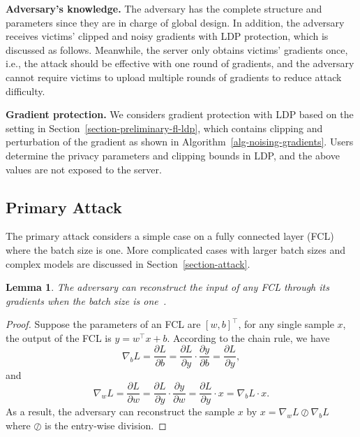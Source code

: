 \documentclass[lettersize,journal]{IEEEtran}
\newtheorem{lemma}{Lemma}
\begin{document}
\textbf{Adversary's knowledge.} 
The adversary has the complete structure and parameters since they are in charge of global design. In addition, the adversary receives victims' clipped and noisy gradients with LDP protection, which is discussed as follows. Meanwhile, the server only obtains victims' gradients once, i.e., the attack should be effective with one round of gradients, and the adversary cannot require victims to upload multiple rounds of gradients to reduce attack difficulty.

\textbf{Gradient protection.} We considers gradient protection with LDP based on the setting in Section~\ref{section-preliminary-fl-ldp}, which contains clipping and perturbation of the gradient as shown in Algorithm~\ref{alg-noising-gradients}. Users determine the privacy parameters and clipping bounds in LDP, and the above values are not exposed to the server.

\subsection{Primary Attack}
\label{section-primacy-attack}

The primary attack considers a simple case on a fully connected layer (FCL) where the batch size is one. More complicated cases with larger batch sizes and complex models are discussed in Section~\ref{section-attack}.

\begin{lemma}
The adversary can reconstruct the input of any FCL through its gradients when the batch size is one~\cite{Geiping2020}.
\label{lemma-attack-1-one-sample}
\end{lemma}

\begin{proof}
Suppose the parameters of an FCL are $[w, b]^\intercal$, for any single sample $x$, the output of the FCL is $y = w^\intercal x + b$.
According to the chain rule, we have
\begin{equation}
\nabla_{b} L = \frac{\partial L }{\partial b} = \frac{\partial L }{\partial y} \cdot \frac{\partial y}{\partial b} = \frac{\partial L}{ \partial y},
\end{equation}
and
\begin{equation}
\nabla_{w} L = \frac{\partial L }{\partial w} = \frac{\partial L }{\partial y} \cdot \frac{\partial y}{\partial w} = \frac{\partial L}{ \partial y} \cdot x = \nabla_{b} L \cdot x.
\end{equation}
As a result, the adversary can reconstruct the sample $x$ by $ x = \nabla_{w} L \oslash \nabla_{b} L$ where $\oslash$ is the entry-wise division.
\end{proof}
\end{document}
